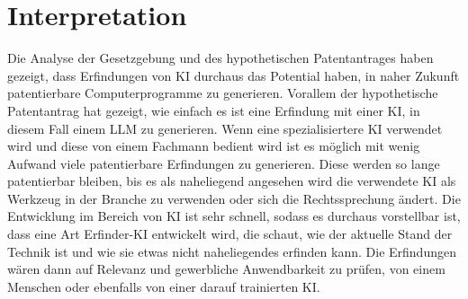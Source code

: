 \section{Interpretation}
Die Analyse der Gesetzgebung und des hypothetischen Patentantrages
haben gezeigt, dass Erfindungen von KI durchaus das Potential
haben, in naher Zukunft patentierbare Computerprogramme zu
generieren. Vorallem der hypothetische Patentantrag hat gezeigt,
wie einfach es ist eine Erfindung mit einer KI, in diesem Fall
einem LLM zu generieren. Wenn eine spezialisiertere KI verwendet 
wird und diese von einem Fachmann bedient wird ist es
möglich mit wenig Aufwand viele patentierbare Erfindungen zu 
generieren. Diese werden so lange patentierbar bleiben,
bis es als naheliegend angesehen wird die verwendete KI
als Werkzeug in der Branche zu verwenden oder sich
die Rechtssprechung ändert. Die Entwicklung im 
Bereich von KI ist sehr schnell, sodass es durchaus vorstellbar
ist, dass eine Art Erfinder-KI entwickelt wird, die schaut,
wie der aktuelle Stand der Technik ist und wie sie etwas nicht 
naheliegendes erfinden kann. Die Erfindungen wären 
dann auf Relevanz und gewerbliche Anwendbarkeit zu prüfen, 
von einem Menschen oder ebenfalls von einer darauf 
trainierten KI. 